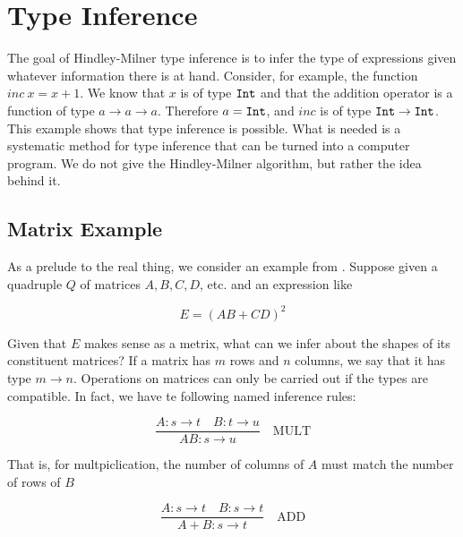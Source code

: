 
\setcounter{section}{5}



\section{Type Inference}

\innertableofcontents

The goal of Hindley-Milner type inference is to infer the type of expressions given whatever information there is at hand.  Consider, for example, the function $inc\ x = x + 1$.  We know that $x$ is of type ${\tt Int}$ and that the addition operator is a function of type $a \to a \to a$.  Therefore $a = {\tt Int}$, and $inc$ is of type ${\tt Int} \to {\tt Int}$. This  example shows that type inference is possible.  What is needed is a systematic method for type inference that can be turned into a computer program.  We do not give the Hindley-Milner algorithm, but rather the idea behind it.

\subsection{Matrix Example}

As a prelude to the real thing, we consider an example from  \cite{1}.  Suppose given a quadruple $Q$ of matrices $A, B, C, D$, etc. and an expression like 

\begin{equation}
\label{unif:expr}
E = (AB + CD)^2
\end{equation}


Given that $E$ makes sense as a metrix, what can we infer about the shapes of its constituent matrices?  If a matrix has $m$ rows and $n$ columns, we say that it has type $m \to n$.  Operations on matrices can only be carried out if the types are compatible.  In fact, we have te following named inference rules:

\begin{equation}
\frac{A : s \to t \quad B : t \to u}{AB : s \to u}\quad \text{MULT}
\end{equation}

That is, for multpiclication, the number of columns of $A$ must match the number of rows of $B$

\begin{equation}
\frac{A : s \to t \quad B : s\to t}{A + B : s \to t}\quad \text{ADD}
\end{equation}


